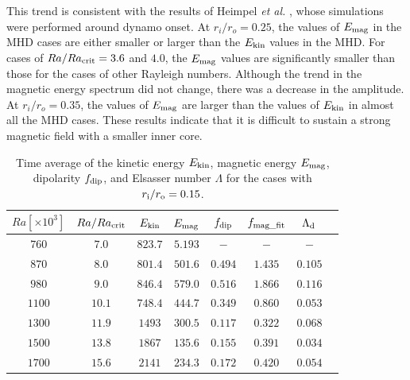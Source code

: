 This trend is consistent with the results of Heimpel {\it et al.} , whose simulations were performed around dynamo onset. 
At $r_i/r_o = 0.25$, the values of $E_{\rm mag}$ in the MHD cases are either smaller or larger than the $E_{\rm kin}$ values in the MHD.
For cases of $Ra/Ra_{\rm crit}  = 3.6$ and $4.0$, the $E_{\rm mag}$ values are significantly smaller than those for the cases of other Rayleigh numbers. 
Although the trend in the magnetic energy spectrum did not change, there was a decrease in the amplitude.
{\color{red}
At $r_i/r_o = 0.35$, the values of $E_{\rm mag}$ are larger than the values of $E_{\rm kin}$ in almost all the MHD cases.
}
{\color{red}
These results indicate that it is difficult to sustain a strong magnetic field with a smaller inner core.
}
%
\begin{table}
\caption{Time average of the kinetic energy $E_{\rm kin}$, magnetic energy $E_{\rm mag}$, dipolarity $f_{\rm dip}$, and Elsasser number $\Lambda$ for the cases with $r_{\rm i}/r_{\rm o} = 0.15$.}
  \begin{tabular}{cccccccc}
      \hline
     $Ra[\times 10^3]$  &  $Ra/Ra_{\rm crit}$&  $E_{\rm kin}$  &  $E_{\rm mag}$ & $f_{\rm dip}$ & $f_{\rm mag\_fit}$ & $\Lambda_{\rm d}$\\
    \hline
    $760$  & $7.0$ &  $823.7$ & $5.193$ & $-$ & $-$ & $-$\\
    $870$  & $8.0$ &  $801.4$ & $501.6$ & $0.494$ & $1.435$ & $0.105$\\
    $980$  & $9.0$ &  $846.4$ & $579.0$ & $0.516$ & $1.866$ &$0.116$\\
    $1100$  & $10.1$ &  $748.4$ & $444.7$ & $0.349$ & $0.860$ & $0.053$\\
    $1300$  & $11.9$ &  $1493$ & $300.5$ & $0.117$ & $0.322$ & $0.068$\\
    $1500$  & $13.8$ &  $1867$ & $135.6$ & $0.155$ & $0.391$ & $0.034$\\
    $1700$  & $15.6$ &  $2141$ & $234.3$ & $0.172$ & $0.420$ & $0.054$\\
     \hline
  \end{tabular}
 \label{table:Summary_15}
 \end{table}
 
